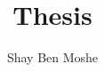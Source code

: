\documentclass[11pt]{article}
\title{Thesis}
\author{Shay Ben Moshe}
\numberwithin{equation}{subsection}
\theoremstyle{definition}
\theoremstyle{remark}
\begin{document}
	\maketitle
	
	\tableofcontents
	
	
	
	
	
	
	
	{}
	
\end{document}
